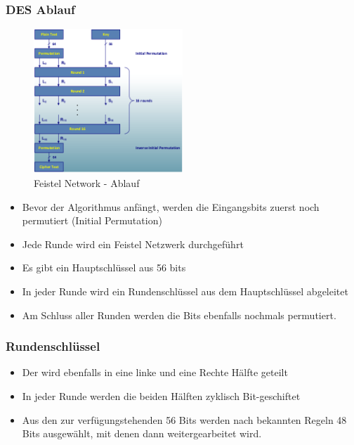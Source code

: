 \hypertarget{des-ablauf}{
\subsubsection{DES Ablauf}\label{des-ablauf}}

\begin{figure}[H]
\centering
\includegraphics[width=0.5\textwidth]{figures/dataEncryptionStandard.png}
\caption{Feistel Network - Ablauf}
\end{figure}

\begin{itemize}
    \item Bevor der Algorithmus anfängt, werden die Eingangsbits zuerst noch permutiert (Initial Permutation)
    \item Jede Runde wird ein Feistel Netzwerk durchgeführt
    \item Es gibt ein Hauptschlüssel aus 56 bits
    \item In jeder Runde wird ein Rundenschlüssel aus dem Hauptschlüssel abgeleitet
    \item Am Schluss aller Runden werden die Bits ebenfalls nochmals permutiert.
\end{itemize}

\hypertarget{rundenschluxfcssel}{%
\subsubsection{Rundenschlüssel}\label{rundenschluxfcssel}}

\begin{itemize}
\tightlist
\item
  Der wird ebenfalls in eine linke und eine Rechte Hälfte geteilt
\item
  In jeder Runde werden die beiden Hälften zyklisch Bit-geschiftet
\item
  Aus den zur verfügungstehenden 56 Bits werden nach bekannten Regeln 48
  Bits ausgewählt, mit denen dann weitergearbeitet wird.
\end{itemize}

